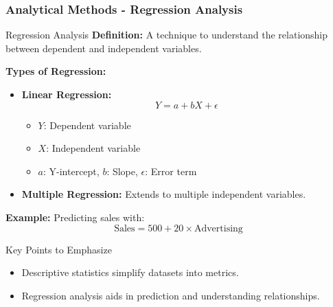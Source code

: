 \documentclass{beamer}
\begin{document}
\begin{frame}[fragile]
    \frametitle{Analytical Methods - Regression Analysis}
    \begin{block}{Regression Analysis}
        \textbf{Definition:} A technique to understand the relationship between dependent and independent variables.

        \textbf{Types of Regression:}
        \begin{itemize}
            \item \textbf{Linear Regression:} 
            \begin{equation}
                Y = a + bX + \epsilon
            \end{equation}
            \begin{itemize}
                \item \( Y \): Dependent variable
                \item \( X \): Independent variable
                \item \( a \): Y-intercept, \( b \): Slope, \( \epsilon \): Error term
            \end{itemize}
            \item \textbf{Multiple Regression:} Extends to multiple independent variables.
        \end{itemize}
        
        \textbf{Example:} Predicting sales with:
        \[
        \text{Sales} = 500 + 20 \times \text{Advertising}
        \]
    \end{block}
    
    \begin{block}{Key Points to Emphasize}
        \begin{itemize}
            \item Descriptive statistics simplify datasets into metrics.
            \item Regression analysis aids in prediction and understanding relationships.
        \end{itemize}
    \end{block}
\end{frame}
\end{document}
